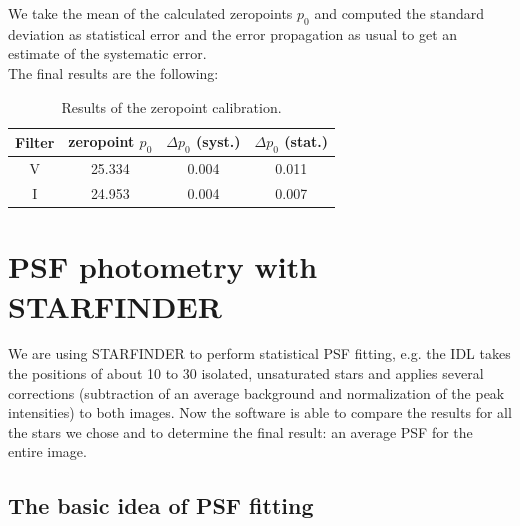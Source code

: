 We take the mean of the calculated zeropoints $p_0$ and computed the standard deviation as statistical error  and the error propagation as usual to get an estimate of the systematic error. \\
The final results are the following:

\begin{table}[H]
\setlength{\tabcolsep}{5mm}
\setlength\extrarowheight{2mm}
\centering
\begin{tabular}{c| c c c}

Filter  & zeropoint $p_0$ & $\Delta p_0$ (syst.) & $\Delta p_0$ (stat.) \\ \hline 

V & 25.334 & 0.004 & 0.011 \\
I & 24.953 & 0.004 & 0.007 \\

\end{tabular}
\caption{Results of the zeropoint calibration.}
\end{table}

\section{PSF photometry with STARFINDER}
We are using STARFINDER to perform statistical PSF fitting, e.g. the IDL takes the positions of about 10 to 30 isolated, unsaturated stars and applies several corrections (subtraction of an average background and normalization of the peak intensities) to both images. Now the software is able to compare the results for all the stars we chose and to determine the final result: an average PSF for the entire image.
\subsection{The basic idea of PSF fitting}

